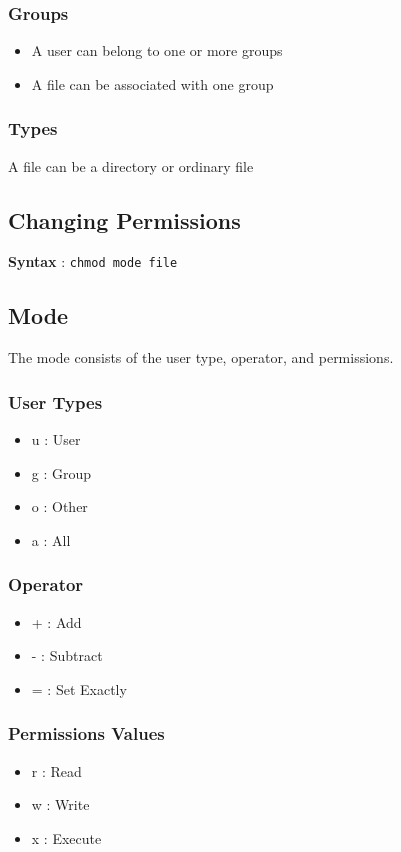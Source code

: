 \documentclass{article}
\begin{document}
\subsubsection{Groups}
\begin{itemize}
\item A user can belong to one or more groups
\item A file can be associated with one group
\end{itemize}

\subsubsection{Types}
A file can be a directory or ordinary file

\subsection{Changing Permissions}
\textbf{Syntax} : \verb|chmod mode file|

\subsection{Mode}

The mode consists of the user type, operator, and permissions.

\subsubsection{User Types}
\begin{itemize}
\item u : User
\item g : Group
\item o : Other
\item a : All
\end{itemize}

\subsubsection{Operator}
\begin{itemize}
\item + : Add
\item - : Subtract
\item = : Set Exactly
\end{itemize}

\subsubsection{Permissions Values}
\begin{itemize}
\item r : Read
\item w : Write 
\item x : Execute
\end{itemize}
\end{document}
